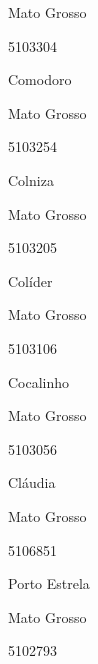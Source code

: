 \documentclass[
  letterpaper,
]{report}
\begin{document}
\n    

\n      

Mato Grosso

\n      

5103304

\n      

Comodoro

\n    

\n    

\n      

Mato Grosso

\n      

5103254

\n      

Colniza

\n    

\n    

\n      

Mato Grosso

\n      

5103205

\n      

Colíder

\n    

\n    

\n      

Mato Grosso

\n      

5103106

\n      

Cocalinho

\n    

\n    

\n      

Mato Grosso

\n      

5103056

\n      

Cláudia

\n    

\n    

\n      

Mato Grosso

\n      

5106851

\n      

Porto Estrela

\n    

\n    

\n      

Mato Grosso

\n      

5102793
\end{document}
